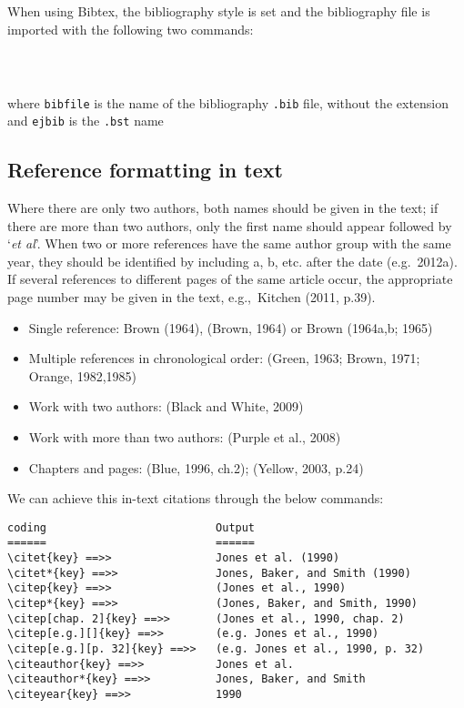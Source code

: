 \documentclass{OUP-EJ}
\begin{document}
When using Bibtex, the bibliography style is set and the bibliography file is imported with the following two commands:
\begin{verbatim}
  
  
\end{verbatim}
where \verb+bibfile+ is the name of the bibliography \verb+.bib+ file, without the extension and \verb+ejbib+ is the  \verb+.bst+ name



\subsection{Reference formatting in text}

Where there are only two authors,
both names should be given in the text; if there are more than two
authors, only the first name should appear followed by `{\it et al}'.
When two or
more references have the same author group with the same year,
they should be identified by including a, b, etc. after the date
(e.g.\ 2012a). If several references to different pages of the same article
occur, the appropriate page number may be given in the text, e.g.,\ Kitchen
(2011, p.39).

\begin{itemize}
\item Single reference: Brown (1964), (Brown, 1964) or Brown (1964a,b; 1965)
\item Multiple references in chronological order: (Green, 1963; Brown, 1971; Orange,
1982,1985)
\item Work with two authors: (Black and White, 2009)
\item Work with more than two authors: (Purple et al., 2008)
\item Chapters and pages: (Blue, 1996, ch.2); (Yellow, 2003, p.24)
\end{itemize}

\clearpage	

\noindent We can achieve this in-text citations through the below commands:
\begin{verbatim}
coding                          Output
======                          ======
\citet{key} ==>>                Jones et al. (1990)
\citet*{key} ==>>               Jones, Baker, and Smith (1990)
\citep{key} ==>>                (Jones et al., 1990)
\citep*{key} ==>>               (Jones, Baker, and Smith, 1990)
\citep[chap. 2]{key} ==>>       (Jones et al., 1990, chap. 2)
\citep[e.g.][]{key} ==>>        (e.g. Jones et al., 1990)
\citep[e.g.][p. 32]{key} ==>>   (e.g. Jones et al., 1990, p. 32)
\citeauthor{key} ==>>           Jones et al.
\citeauthor*{key} ==>>          Jones, Baker, and Smith
\citeyear{key} ==>>             1990
\end{verbatim}
\end{document}
